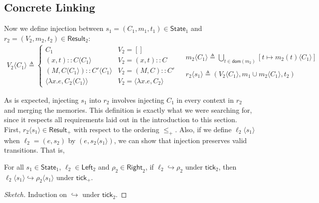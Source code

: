 \documentclass[acmsmall,screen,review]{acmart}\settopmatter{printfolios=true,printccs=false,printacmref=false}
\newcommand*{\cons}{::}
\newcommand*{\Left}{\mathsf{Left}}
\newcommand*{\Right}{\mathsf{Right}}
\newcommand*{\mem}{m}
\newcommand*{\State}{\mathsf{State}}
\newcommand*{\Result}{\mathsf{Result}}
\newcommand*{\semarrow}{\hookrightarrow}
\newcommand*{\tick}{\mathsf{tick}}
\newcommand*{\inject}[2]{{#2}\langle{#1}\rangle}
\begin{document}
\subsection{Concrete Linking}
Now we define injection between $s_1=(C_1,\mem_1,t_1)\in\State_1$ and $r_2=(V_2,\mem_2,t_2)\in\Result_2$:
\[
  \begin{array}{cc}
    \inject{C_{1}}{V_{2}}\triangleq
    \begin{cases}
      C_1                                           & V_{2}=[]                            \\
      (x, t)\cons\inject{C_{1}}{C}                  & V_{2}=(x,t)\cons C                  \\
      (M, \inject{C_{1}}{C})\cons\inject{C_{1}}{C'} & V_{2}=(M,C)\cons C'                 \\
      \langle\lambda x.e,\inject{C_1}{C_2}\rangle   & V_{2}=\langle\lambda x.e,C_2\rangle
    \end{cases} &
    \begin{array}{l}
      \inject{C_1}{\mem_2}\triangleq
      \displaystyle\bigcup_{t\in\mathsf{dom}(\mem_2)}[t\mapsto\inject{C_1}{\mem_2(t)}] \\ \\
      \inject{s_1}{r_2}\triangleq
      (\inject{C_1}{V_2},\mem_1\cup\inject{C_1}{\mem_2},t_2)
    \end{array}
  \end{array}
\]

As is expected, injecting $s_1$ into $r_2$ involves injecting $C_1$ in every context in $r_2$ and merging the memories.
This definition is exactly what we were searching for, since it respects all requirements laid out in the introduction to this section.
First, $\inject{s_1}{r_2}\in\Result_+$ with respect to the ordering $\le_+$.
Also, if we define $\inject{s_1}{\ell_2}$ when $\ell_2=(e,s_2)$ by $(e,\inject{s_1}{s_2})$, we can show that injection preserves valid transitions. That is,
\begin{lemma}
  For all $s_1\in\State_1$, $\ell_2\in\Left_2$ and $\rho_2\in\Right_2$,
  if $\ell_2\semarrow\rho_2$ under $\tick_2$, then $\inject{s_1}{\ell_2}\semarrow\inject{s_1}{\rho_2}$ under $\tick_+$.
\end{lemma}
\begin{proof}[Sketch]
  Induction on $\semarrow$ under $\tick_2$.
\end{proof}
\end{document}
